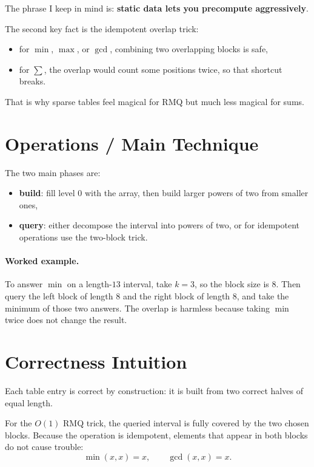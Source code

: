The phrase I keep in mind is: \textbf{static data lets you precompute aggressively}.

The second key fact is the idempotent overlap trick:

\begin{itemize}
  \item for \(\min\), \(\max\), or \(\gcd\), combining two overlapping blocks is safe,
  \item for \(\sum\), the overlap would count some positions twice, so that shortcut breaks.
\end{itemize}

That is why sparse tables feel magical for RMQ but much less magical for sums.

\section*{Operations / Main Technique}

The two main phases are:

\begin{itemize}
  \item \textbf{build}: fill level \(0\) with the array, then build larger powers of two from smaller ones,
  \item \textbf{query}: either decompose the interval into powers of two, or for idempotent operations use the two-block trick.
\end{itemize}

\paragraph{Worked example.}
To answer \(\min\) on a length-\(13\) interval, take \(k = 3\), so the block size is \(8\). Then query the left block
of length \(8\) and the right block of length \(8\), and take the minimum of those two answers. The overlap is harmless
because taking \(\min\) twice does not change the result.

\section*{Correctness Intuition}

Each table entry is correct by construction: it is built from two correct halves of equal length.

For the \(O(1)\) RMQ trick, the queried interval is fully covered by the two chosen blocks. Because the operation is
idempotent, elements that appear in both blocks do not cause trouble:
\[
\min(x, x) = x,
\qquad
\gcd(x, x) = x.
\]

